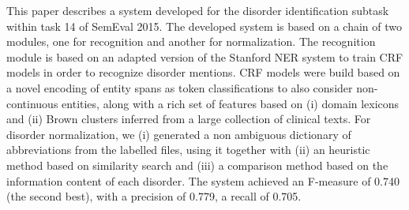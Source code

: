 This paper describes a system developed for the disorder identification subtask within task 14 of SemEval 2015. The developed system is based on a chain of two modules, one for recognition and another for normalization. The recognition module is based on an adapted version of the Stanford NER system to train CRF models in order to recognize disorder mentions. CRF models were build based on a novel encoding of entity spans as token classifications to also consider non-continuous entities, along with a rich set of features based on (i) domain lexicons and (ii) Brown clusters inferred from a large collection of clinical texts. For disorder normalization, we (i) generated a non ambiguous dictionary of abbreviations from the labelled files, using it together with (ii) an heuristic method based on similarity search and (iii) a comparison method based on the information content of each disorder. The system achieved an F-measure of 0.740 (the second best), with a precision of 0.779, a recall of 0.705.

